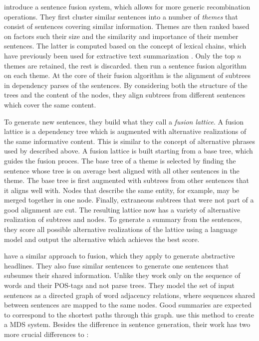 \documentclass[a4paper,BCOR=10mm]{report}
\numberwithin{lemma}{chapter}
\numberwithin{definition}{chapter}
\begin{document}
\citet{barzilay+mckeown} introduce a sentence fusion system, which allows for more generic recombination operations. They first cluster similar sentences into a number of \textit{themes} that consist of sentences covering similar information.
Themes are then ranked based on factors such their size and the similarity and importance of their member sentences. The latter is computed based on the concept of lexical chains, which have previously been used for extractive text summarization \citep{lexical-chains}. Only the top $n$ themes are retained, the rest is discarded.
\citeauthor{barzilay+mckeown} then run a sentence fusion algorithm on each theme.
At the core of their fusion algorithm is the alignment of subtrees in dependency parses of the sentences.
By considering both the structure of the trees and the content of the nodes, they align subtrees from different sentences which cover the same content.

To generate new sentences, they build what they call a \textit{fusion lattice}. A fusion lattice is a dependency tree which is augmented with alternative realizations of the same informative content. This is similar to the concept of alternative phrases used by \citet{bing} described above.
A fusion lattice is built starting from a base tree, which guides the fusion proces. The base tree of a theme is selected by finding the sentence whose tree is on average best aligned with all other sentences in the theme.
The base tree is first augmented with subtrees from other sentences that it aligns well with. Nodes that describe the same entity, for example, may be merged together in one node. Finally, extraneous subtrees that were not part of a good alignment are cut.
The resulting lattice now has a variety of alternative realization of subtrees and nodes.
To generate a summary from the sentences, they score all possible alternative realizations of the lattice using a language model and output the alternative which achieves the best score.

\citet{filippova} have a similar approach to fusion, which they apply to generate abstractive headlines. They also fuse similar sentences to generate one sentences that subsumes their shared information. Unlike \citet{barzilay+mckeown} they work only on the sequence of words and their POS-tags and not parse trees. They model the set of input sentences as a directed graph of word adjacency relations, where sequences shared between sentences are mapped to the same nodes. Good summaries are expected to correspond to the shortest paths through this graph.
\citet{banerjee} use this method to create a MDS system. Besides the difference in sentence generation, their work has two more crucial differences to \citeauthor{barzilay+mckeown}:
\end{document}

